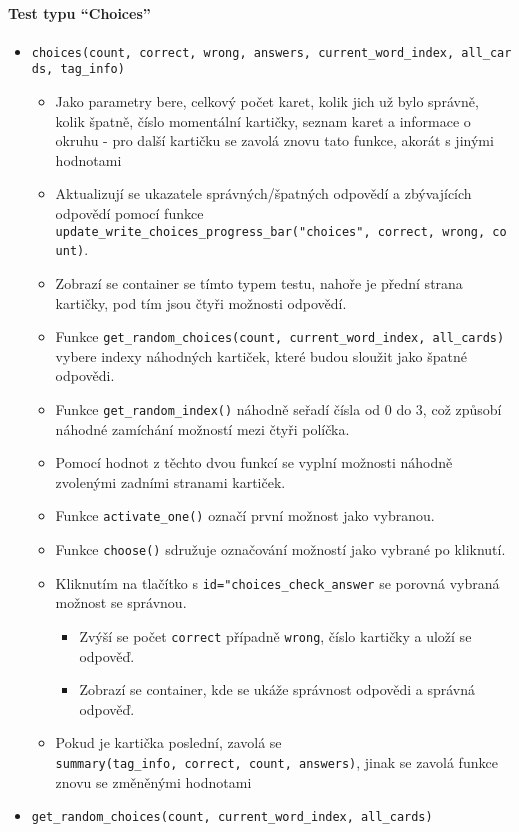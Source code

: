 \documentclass[11pt]{article}
\providecommand{\tightlist}{\setlength{\itemsep}{1pt}\setlength{\parskip}{1pt}}
\let\oldtexttt\texttt
\renewcommand{\texttt}[1]{\oldtexttt{\textcolor{codehighlight}{#1}}}
\begin{document}
\hypertarget{test-typu-choices}{%
\paragraph{Test typu ``Choices''}\label{test-typu-choices}}

\begin{itemize}
\tightlist
\item
  \texttt{choices(count,\ correct,\ wrong,\ answers,\ current\_word\_index,\ all\_cards,\ tag\_info)}

  \begin{itemize}
  \tightlist
  \item
    Jako parametry bere, celkový počet karet, kolik jich už bylo
    správně, kolik špatně, číslo momentální kartičky, seznam karet a
    informace o okruhu - pro další kartičku se zavolá znovu tato funkce,
    akorát s jinými hodnotami
  \item
    Aktualizují se ukazatele správných/špatných odpovědí a zbývajících
    odpovědí pomocí funkce
    \texttt{update\_write\_choices\_progress\_bar("choices",\ correct,\ wrong,\ count)}.
  \item
    Zobrazí se container se tímto typem testu, nahoře je přední strana
    kartičky, pod tím jsou čtyři možnosti odpovědí.
  \item
    Funkce
    \texttt{get\_random\_choices(count,\ current\_word\_index,\ all\_cards)}
    vybere indexy náhodných kartiček, které budou sloužit jako špatné
    odpovědi.
  \item
    Funkce \texttt{get\_random\_index()} náhodně seřadí čísla od 0 do 3,
    což způsobí náhodné zamíchání možností mezi čtyři políčka.
  \item
    Pomocí hodnot z těchto dvou funkcí se vyplní možnosti náhodně
    zvolenými zadními stranami kartiček.
  \item
    Funkce \texttt{activate\_one()} označí první možnost jako vybranou.
  \item
    Funkce \texttt{choose()} sdružuje označování možností jako vybrané
    po kliknutí.
  \item
    Kliknutím na tlačítko s \texttt{id="choices\_check\_answer} se
    porovná vybraná možnost se správnou.

    \begin{itemize}
    \tightlist
    \item
      Zvýší se počet \texttt{correct} případně \texttt{wrong}, číslo
      kartičky a uloží se odpověď.
    \item
      Zobrazí se container, kde se ukáže správnost odpovědi a správná
      odpověď.
    \end{itemize}
  \item
    Pokud je kartička poslední, zavolá se
    \texttt{summary(tag\_info,\ correct,\ count,\ answers)}, jinak se
    zavolá funkce znovu se změněnými hodnotami
  \end{itemize}
\item
  \texttt{get\_random\_choices(count,\ current\_word\_index,\ all\_cards)}


\end{itemize}
\end{document}
